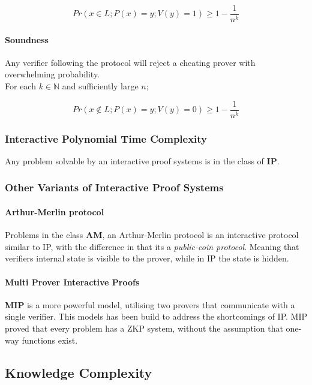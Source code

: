 $$Pr(x \in L; P(x) = y; V(y) = 1) \ge 1 - \frac{1}{n^k}$$

\paragraph{Soundness}

Any verifier following the protocol will reject a cheating prover with overwhelming probability.\\
For each $k \in \mathbb{N}$ and sufficiently large $n$;

$$Pr(x \notin L; P(x) = y; V(y) = 0) \ge 1 - \frac{1}{n^k}$$


\subsubsection{Interactive Polynomial Time Complexity}
Any problem solvable by an interactive proof systems is in the class of \textbf{IP}.

\subsubsection{Other Variants of Interactive Proof Systems}

\paragraph{Arthur-Merlin protocol} Problems in the class \textbf{AM}, an Arthur-Merlin protocol \cite{babai1985trading} is an interactive protocol similar to IP, with the difference in that its a \textit{public-coin protocol}. 
Meaning that verifiers internal state is visible to the prover, while in IP the state is hidden.

\paragraph{Multi Prover Interactive Proofs}
\textbf{MIP} \cite{ben2019multi} is a more powerful model, utilising two provers that communicate with a single verifier.
This models has been build to address the shortcomings of IP.
MIP proved that every problem has a ZKP system, without the assumption that one-way functions exist.

\subsection{Knowledge Complexity}

